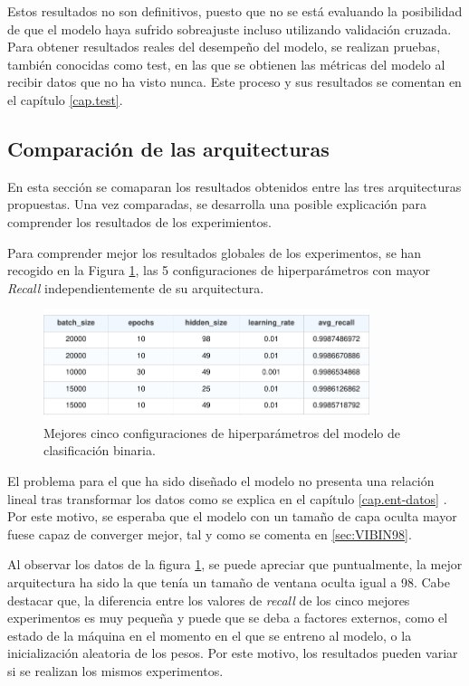 Estos resultados no son definitivos, puesto que no se está evaluando la posibilidad de que el modelo haya sufrido sobreajuste incluso utilizando validación cruzada. Para obtener resultados reales del desempeño del modelo, se realizan pruebas, también conocidas como test, en las que se obtienen las métricas del modelo al recibir datos que no ha visto nunca. Este proceso y sus resultados se comentan en el capítulo \ref{cap.test}.


\subsection{Comparación de las arquitecturas} \label{sec:comp.BIN}
En esta sección se comaparan los resultados obtenidos entre las tres arquitecturas propuestas. Una vez comparadas, se desarrolla una posible explicación para comprender los resultados de los experimientos.

Para comprender mejor los resultados globales de los experimentos, se han recogido en la Figura \ref{fig:BINtop5}, las 5 configuraciones de hiperparámetros con mayor \textit{Recall} independientemente de su arquitectura.

\begin{figure}[H]
    \centering
    \includegraphics[width=0.85\textwidth]{./img/modelo/BINtop5.pdf}
    \caption{Mejores cinco configuraciones de hiperparámetros del modelo de clasificación binaria.}
    \label{fig:BINtop5}
\end{figure}

El problema para el que ha sido diseñado el modelo no presenta una relación lineal tras transformar los datos como se explica en el capítulo \ref{cap.ent-datos} . Por este motivo, se esperaba que el modelo con un tamaño de capa oculta mayor fuese capaz de converger mejor, tal y como se comenta en \ref{sec:VIBIN98}.

Al observar los datos de la figura \ref{fig:BINtop5}, se puede apreciar que puntualmente, la mejor arquitectura ha sido la que tenía un tamaño de ventana oculta igual a 98. Cabe destacar que, la diferencia entre los valores de \textit{recall} de los cinco mejores experimentos es muy pequeña y puede que se deba a factores externos, como el estado de la máquina en el momento en el que se entreno al modelo, o la inicialización aleatoria de los pesos. Por este motivo, los resultados pueden variar si se realizan los mismos experimentos.


